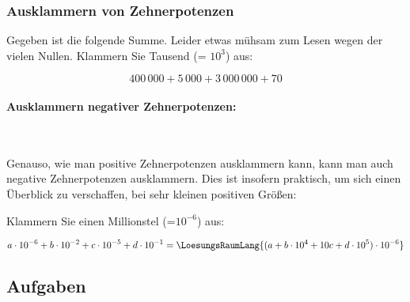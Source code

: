 

\newpage


\subsubsection{Ausklammern von Zehnerpotenzen}
Gegeben ist die folgende Summe. Leider etwas mühsam zum Lesen wegen der vielen Nullen. Klammern Sie Tausend (= $10^3$) aus:

$$400\,000 + 5\,000 + 3\,000\,000 + 70$$


\paragraph{Ausklammern negativer Zehnerpotenzen:}
\,

\vspace{1mm}

Genauso, wie man positive Zehnerpotenzen ausklammern kann, kann man auch negative Zehnerpotenzen ausklammern. Dies ist insofern praktisch, um sich einen Überblick zu verschaffen, bei sehr kleinen positiven Größen:

Klammern Sie einen Millionstel (=$10^{-6}$) aus:


$$a\cdot{}10^{-6} + b\cdot{}10^{-2} + c\cdot{}10^{-5} +
d\cdot{}10^{-1} = \LoesungsRaumLang{(a + b\cdot{}10^4 + 10c + d\cdot{}10^{5}) \cdot{} 10^{-6}}$$

\subsection*{Aufgaben}


\newpage

